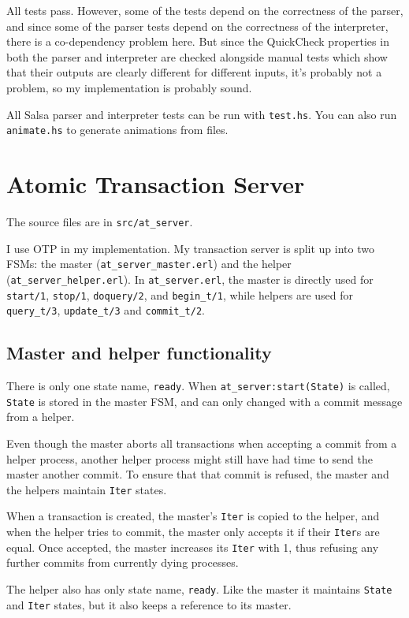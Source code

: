 \documentclass[10pt,a4paper]{article}
\begin{document}
All tests pass.  However, some of the tests depend on the correctness of the
parser, and since some of the parser tests depend on the correctness of the
interpreter, there is a co-dependency problem here.  But since the QuickCheck
properties in both the parser and interpreter are checked alongside manual tests
which show that their outputs are clearly different for different inputs, it's
probably not a problem, so my implementation is probably sound.

All Salsa parser and interpreter tests can be run with \verb+test.hs+.  You can
also run \verb+animate.hs+ to generate animations from files.


\newpage
\section{Atomic Transaction Server}

The source files are in \verb+src/at_server+.

I use OTP in my implementation.  My transaction server is split up into two
FSMs: the master (\verb+at_server_master.erl+) and the helper
(\verb+at_server_helper.erl+).  In \verb+at_server.erl+, the master is directly
used for \verb+start/1+, \verb+stop/1+, \verb+doquery/2+, and \verb+begin_t/1+,
while helpers are used for \verb+query_t/3+, \verb+update_t/3+ and
\verb+commit_t/2+.


\subsection{Master and helper functionality}

There is only one state name, \verb+ready+.  When \verb+at_server:start(State)+
is called, \verb+State+ is stored in the master FSM, and can only changed with a
commit message from a helper.

Even though the master aborts all transactions when accepting a commit from a
helper process, another helper process might still have had time to send the
master another commit.  To ensure that that commit is refused, the master and
the helpers maintain \verb+Iter+ states.

When a transaction is created, the master's \verb+Iter+ is copied to the helper,
and when the helper tries to commit, the master only accepts it if their
\verb+Iter+s are equal.  Once accepted, the master increases its \verb+Iter+
with 1, thus refusing any further commits from currently dying processes.

The helper also has only state name, \verb+ready+.  Like the master it maintains
\verb+State+ and \verb+Iter+ states, but it also keeps a reference to its
master.
\end{document}
